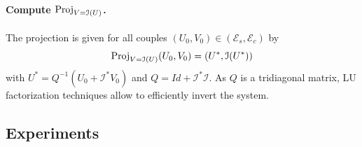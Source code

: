 \paragraph{Compute $\mathop{}\mathopen{}\mathrm{Proj}_{V = \mathcal{I}(U)}$.}
The projection is given for all couples $(U_0,V_0) \in (\mathcal{E}_s, \mathcal{E}_c )$ by 
\[
\mathop{}\mathopen{}\mathrm{Proj}_{V = \mathcal{I}(U)} (U_0,V_0) = (U^*, \mathcal{I}(U^*))
\]
with $U^*=Q^{-1}(U_0+\mathcal{I}^*V_0)$ and $Q=Id+\mathcal{I}^*\mathcal{I}$.
As $Q$ is a tridiagonal matrix, LU factorization techniques allow to efficiently invert the system.


\subsection{Experiments}

